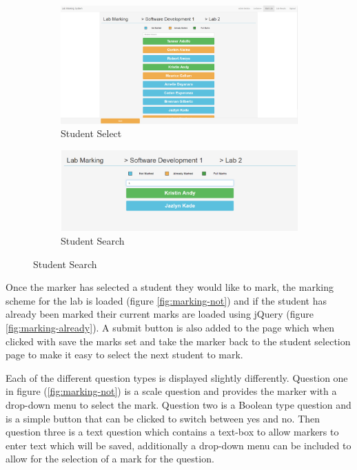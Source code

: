 \documentclass[12pt]{article}  %
\begin{document}
\begin{figure}[H]
\caption{Selecting Student Page}
\centering
\begin{subfigure}[c]{0.45\textwidth}
    \includegraphics[width=1\textwidth]{images/implementation/marking-3-page.png}
    \caption{Student Select}
    \label{fig:marking-student}
\end{subfigure}
\hfill
\begin{subfigure}[c]{0.45\textwidth}
    \includegraphics[width=1\textwidth]{images/implementation/marking-4-page.png}
    \caption{Student Search}
    \label{fig:marking-search}
\end{subfigure}

\end{figure}

\noindent Once the marker has selected a student they would like to mark, the marking scheme for the lab is loaded (figure \ref{fig:marking-not}) and if the student has already been marked their current marks are loaded using jQuery (figure \ref{fig:marking-already}). A submit button is also added to the page which when clicked with save the marks set and take the marker back to the student selection page to make it easy to select the next student to mark.

Each of the different question types is displayed slightly differently. Question one in figure (\ref{fig:marking-not}) is a scale question and provides the marker with a drop-down menu to select the mark. Question two is a Boolean type question and is a simple button that can be clicked to switch between yes and no. Then question three is a text question which contains a text-box to allow markers to enter text which will be saved, additionally a drop-down menu can be included to allow for the selection of a mark for the question. 
\end{document}
